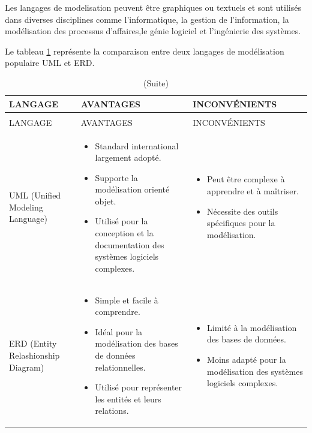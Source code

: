 \documentclass[12pt]{report}
\begin{document}
				Les langages de modelisation peuvent être graphiques ou textuels et sont utilisés dans diverses disciplines comme l'informatique, la gestion de l'information, la modélisation des processus d'affaires,le génie logiciel et l'ingénierie des systèmes.


				Le tableau \ref{tab:Lmodel} représente la comparaison entre deux langages de modélisation populaire UML et ERD.

				
				\begin{longtable}{|p{3cm}|p{5.5cm}|p{5.5cm}|} 
						\caption{Comparaison entre UML et ERD.} 
						\label{tab:Lmodel}\\ 
						\hline 
						LANGAGE & AVANTAGES & INCONVÉNIENTS\\ 
						\hline 
						\endfirsthead 	
						\caption[]{(Suite)}\\ 
						\hline 
						LANGAGE & AVANTAGES & INCONVÉNIENTS\\ 
						\hline 
						\endhead
						UML (Unified Modeling Language) &
						\begin{itemize}
							\item Standard international largement adopté.
							\item Supporte la modélisation orienté objet.
							\item Utilisé pour la conception et la documentation des systèmes logiciels complexes.
						\end{itemize}
						&
						\begin{itemize}
							\item Peut être complexe à apprendre et à maîtriser. 
							\item Nécessite des outils spécifiques pour la modélisation.
						\end{itemize}\\						
						\hline
						ERD (Entity Relashionship Diagram) &
						\begin{itemize}
							\item Simple et facile à comprendre.
							\item Idéal pour la modélisation des bases de données relationnelles.
							\item Utilisé pour représenter les entités et leurs relations.
						\end{itemize} &
						\begin{itemize}
							\item Limité à la modélisation des bases de données.
							\item Moins adapté pour la modélisation des systèmes logiciels complexes.
						\end{itemize} \\
						\hline
				    \end{longtable}
\end{document}

